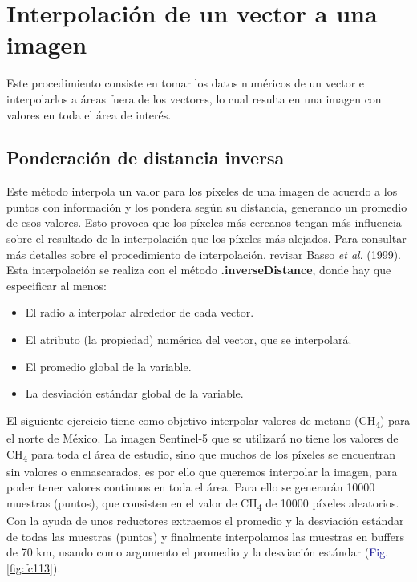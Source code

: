 \documentclass[
  12pt,
  letterpaper,
  twoside]{book}
\providecommand{\tightlist}{%
  \setlength{\itemsep}{0pt}\setlength{\parskip}{0pt}}
\newcommand\boldpurple[1]{\textcolor{darkpurple}{\textbf{#1}}}
\begin{document}
\hypertarget{interpolaciuxf3n-de-un-vector-a-una-imagen}{%
\section{Interpolación de un vector a una imagen}\label{interpolaciuxf3n-de-un-vector-a-una-imagen}}

Este procedimiento consiste en tomar los datos numéricos de un vector e
interpolarlos a áreas fuera de los vectores, lo cual resulta en una
imagen con valores en toda el área de interés.

\hypertarget{ponderaciuxf3n-de-distancia-inversa}{%
\subsection*{Ponderación de distancia inversa}\label{ponderaciuxf3n-de-distancia-inversa}}

 Este método interpola un valor para los píxeles
de una imagen de acuerdo a los puntos con información y los pondera
según su distancia, generando un promedio de esos valores. Esto provoca
que los píxeles más cercanos tengan más influencia sobre el resultado de
la interpolación que los píxeles más alejados. Para consultar más
detalles sobre el procedimiento de interpolación, revisar Basso \emph{et al}.
(1999). Esta interpolación se realiza con el método \boldpurple{.inverseDistance},
donde hay que especificar al menos:

\begin{itemize}
\tightlist
\item
  El radio a interpolar alrededor de cada vector.
\item
  El atributo (la propiedad) numérica del vector, que se interpolará.
\item
  El promedio global de la variable.
\item
  La desviación estándar global de la variable.
\end{itemize}

El siguiente ejercicio tiene como objetivo interpolar valores de metano
(CH\textsubscript{4}) para el norte de México. La imagen Sentinel-5 que se utilizará
no tiene los valores de CH\textsubscript{4} para toda el área de estudio, sino que
muchos de los píxeles se encuentran sin valores o enmascarados, es por
ello que queremos interpolar la imagen, para poder tener valores
continuos en toda el área. Para ello se generarán 10000 muestras
(puntos), que consisten en el valor de CH\textsubscript{4} de 10000 píxeles
aleatorios. Con la ayuda de unos reductores extraemos el promedio y la
desviación estándar de todas las muestras (puntos) y finalmente
interpolamos las muestras en buffers de 70 km, usando como argumento el
promedio y la desviación estándar (\textcolor{darkblue}{Fig.}
\ref{fig:fc113}).
\end{document}
